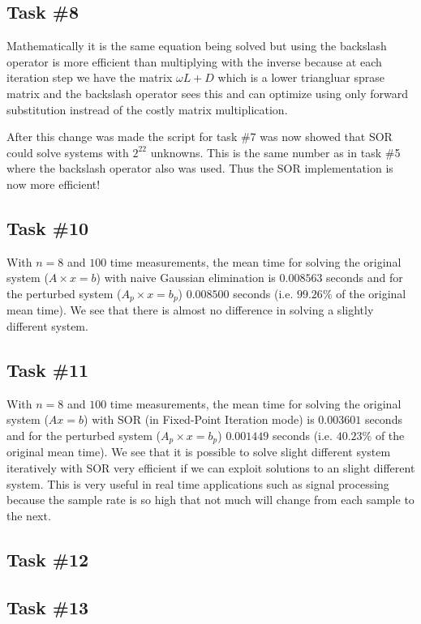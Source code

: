\documentclass[10pt, a4paper]{article}
\begin{document}
\subsection{Task \#8}
Mathematically it is the same equation being solved but using the backslash operator is more efficient than multiplying with the inverse because at each iteration step we have the matrix $\omega L + D$ which is a lower triangluar sprase matrix and the backslash operator sees this and can optimize using only forward substitution instread of the costly matrix multiplication.

After this change was made the script for task \#7 was now showed that SOR could solve systems with $2^{22}$ unknowns. This is the same number as in task \#5 where the backslash operator also was used. Thus the SOR implementation is now more efficient!

\subsection{Task \#10}
With $n=8$ and $100$ time measurements, the mean time for solving the original system ($A\times x=b$) with naive Gaussian elimination is $0.008563$ seconds  and for the perturbed system ($A_p\times x=b_p$) $0.008500$ seconds (i.e. $99.26\%$ of the original mean time). We see that there is almost no difference in solving a slightly different system.

\subsection{Task \#11}
With $n=8$ and $100$ time measurements, the mean time for solving the original system ($Ax=b$) with SOR (in Fixed-Point Iteration mode) is $0.003601$ seconds and for the perturbed system ($A_p\times x=b_p$) $0.001449$ seconds (i.e. $40.23\%$ of the original mean time). We see that it is possible to solve slight different system iteratively with SOR very efficient if we can exploit solutions to an slight different system. This is very useful in real time applications such as signal processing because the sample rate is so high that not much will change from each sample to the next.

\subsection{Task \#12}

\subsection{Task \#13}
\end{document}
